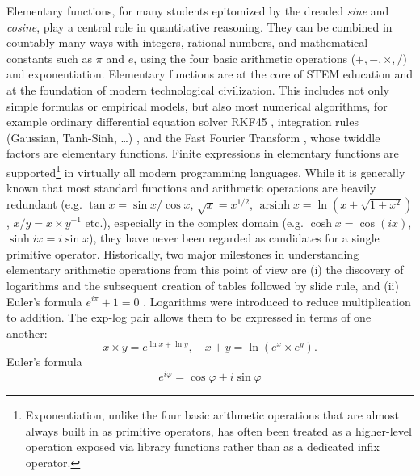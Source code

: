 \documentclass[12pt]{article}
\DeclareMathOperator{\arsinh}{arsinh}
\begin{document}
Elementary functions, for many students epitomized by the dreaded \emph{sine} and \emph{cosine}, play a central role in quantitative reasoning. They can be combined in countably many ways with integers, rational numbers, and mathematical constants such as $\pi$ and $e$, using the four basic arithmetic operations ($+,-,\times, /$) and exponentiation. Elementary functions are at the core of STEM education and at the foundation of modern technological civilization. This includes not only simple formulas or empirical models, but also most numerical algorithms, for example ordinary differential equation solver RKF45 \cite{Fehlberg1970}, integration rules (Gaussian, Tanh-Sinh, \ldots) \cite{TakahashiMori1974,NumericalRecipes}, and the Fast Fourier Transform \cite{CooleyTukey1965}, whose twiddle factors are elementary functions. Finite expressions in elementary functions are supported\footnote{Exponentiation, unlike the four basic arithmetic operations that are almost always built in as primitive operators, has often been treated as a higher-level operation exposed via library functions rather than as a dedicated infix operator.} in virtually all modern programming languages.  While it is generally known that most standard functions and arithmetic operations are heavily redundant (e.g. $\tan{x} = \sin{x}/\cos{x}$, $\sqrt{x} = x^{1/2}$,  $\arsinh{x} = \ln{(x+\sqrt{1+x^2})}$, $x/y = x \times y^{-1}$ etc.), especially in the complex domain (e.g. $\cosh{x} = \cos{(ix)}$, $\sinh{i x} = i \sin{x}$), they have never been regarded as candidates for a single primitive operator. Historically, two major milestones in understanding elementary arithmetic operations from this point of view are (i) the discovery of logarithms and the subsequent creation of tables \cite{Napier,Briggs} followed by slide rule, and (ii) Euler’s formula $e^{i \pi}+1=0$ \cite{Cotes1722}.
Logarithms were introduced to reduce multiplication to addition. The exp-log pair allows them to be expressed in terms of one another:
\begin{equation}
\label{log_tbl}
x \times y = e^{\ln{x} + \ln{y}}, \quad x + y = \ln{\left( e^x \times e^y\right)}.
\end{equation}
Euler’s formula 
\begin{equation}
\label{Euler}
e^{i \varphi}=\cos{\varphi} + i \sin{\varphi}
\end{equation}
\end{document}
